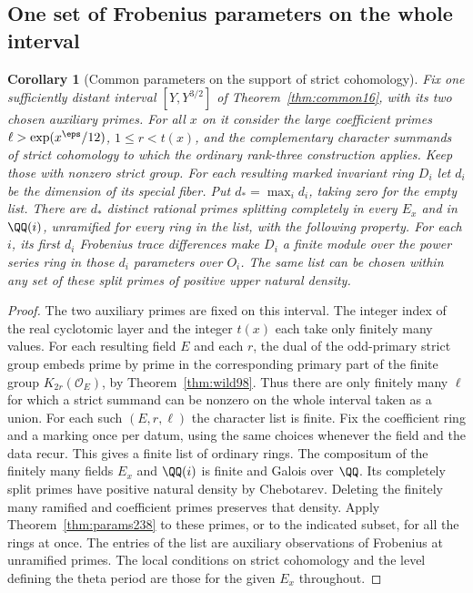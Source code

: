 \documentclass[a4paper,11pt]{article}
\newtheorem{corollary}[proposition]{Corollary}
\theoremstyle{definition}
\theoremstyle{remark}
\numberwithin{equation}{section}
\begin{document}
\subsection{One set of Frobenius parameters on the whole interval}\label{nav:II-44}
\begin{corollary}[Common parameters on the support of strict cohomology]
\leavevmode\label{cor:interval238}
Fix one sufficiently distant interval \([Y,Y^{3/2}]\) of
Theorem~\ref{thm:common16}, with its two chosen auxiliary primes.
For all \(x\) on it consider the large coefficient primes
\(\ell>\exp(x^\eps/12)\), \(1\le r<t(x)\), and the complementary
character summands of strict cohomology to which the ordinary
rank-three construction applies. Keep those with nonzero strict group.
For each resulting marked invariant ring \(D_i\) let \(d_i\) be the
dimension of its special fiber. Put \(d_*=\max_i d_i\), taking zero
for the empty list. There are \(d_*\) distinct rational primes splitting
completely in every \(E_x\) and in \(\QQ(i)\), unramified for every
ring in the list, with the following property. For each \(i\), its first
\(d_i\) Frobenius trace differences make \(D_i\) a finite module
over the power series ring in those \(d_i\) parameters over \(O_i\).
The same list can be chosen within any set of these split primes of
positive upper natural density.
\end{corollary}
\begin{proof}
The two auxiliary primes are fixed on this interval. The integer
index of the real cyclotomic layer and the integer \(t(x)\) each take
only finitely many values. For each resulting field \(E\) and each
\(r\), the dual of the odd-primary strict group embeds prime by prime
in the corresponding primary part of the finite group
\(K_{2r}(\mathcal O_E)\), by Theorem~\ref{thm:wild98}.
Thus there are only finitely many \(\ell\) for which a strict summand
can be nonzero on the whole interval taken as a union. For each such
\((E,r,\ell)\) the character list is finite. Fix the coefficient ring
and a marking once per datum, using the same choices whenever the
field and the data recur. This gives a finite list of ordinary rings.
The compositum of the finitely many fields \(E_x\) and \(\QQ(i)\) is
finite and Galois over \(\QQ\). Its completely split primes have
positive natural density by Chebotarev. Deleting the finitely many
ramified and coefficient primes preserves that density. Apply
Theorem~\ref{thm:params238} to these primes, or to the indicated
subset, for all the rings at once. The entries of the list are
auxiliary observations of Frobenius at unramified primes. The local
conditions on strict cohomology and the level defining the theta
period are those for the given \(E_x\) throughout.
\end{proof}
\end{document}
